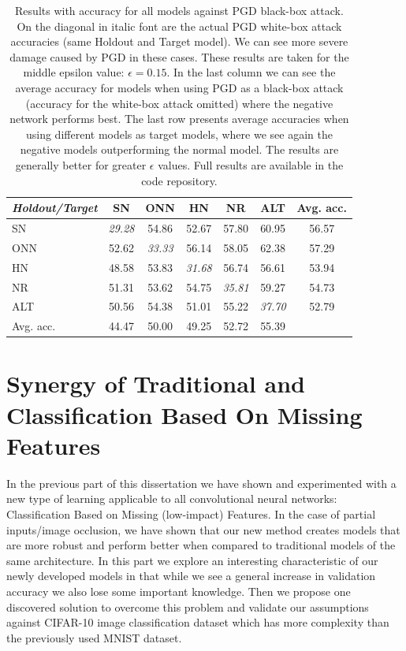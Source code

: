 \documentclass[b5paper]{book}
\begin{document}
\begin{table}[ht]
  \centering
  \begin{tabular}{l|ccccc|c}
    \toprule
     \textit{Holdout/Target} & SN & ONN & HN & NR & ALT & {Avg. acc.} \\
    \midrule
     SN & \textit{{29.28}} & {54.86} & {52.67} & {57.80} & {60.95} & {56.57} \\
     ONN & {52.62} & \textit{{33.33}} & {56.14} & {58.05} & {62.38} & {57.29} \\
     HN & {48.58} & {53.83} & \textit{{31.68}} & {56.74} & {56.61} & {53.94} \\
     NR &{51.31} & {53.62} & {54.75} & \textit{{35.81}} & {59.27} & {54.73}\\ 
     ALT & {50.56} & {54.38} & {51.01} & {55.22} & \textit{{37.70}} & {52.79}\\
    \midrule 
     Avg. acc. & {44.47} & {50.00} & {49.25} & {52.72} & {55.39} \\
    \bottomrule
  \end{tabular}
  \caption{Results with accuracy for all models against PGD black-box attack. On the diagonal in italic font are the actual PGD white-box attack accuracies (same Holdout and Target model). We can see more severe damage caused by PGD in these cases. These results are taken for the middle epsilon value: \(\epsilon = 0.15 \). In the last column we can see the average accuracy for models when using PGD as a black-box attack (accuracy for the white-box attack omitted) where the negative network performs best. The last row presents average accuracies when using different models as target models, where we see again the negative models outperforming the normal model. The results are generally better for greater \(\epsilon\) values. Full results are available in the code repository.}
  \label{tab:results-pgd}
\end{table} 

\part{Synergy of Traditional and Classification Based On Missing Features}

In the previous part of this dissertation we have shown and experimented with a new type of learning applicable to all convolutional neural networks: Classification Based on Missing (low-impact) Features. In the case of partial inputs/image occlusion, we have shown that our new method creates models that are more robust and perform better when compared to traditional models of the same architecture. In this part we explore an interesting characteristic of our newly developed models in that while we see a general increase in validation accuracy we also lose some important knowledge. Then we propose one discovered solution to overcome this problem and validate our assumptions against CIFAR-10 image classification dataset which has more complexity than the previously used MNIST dataset.
\end{document}
